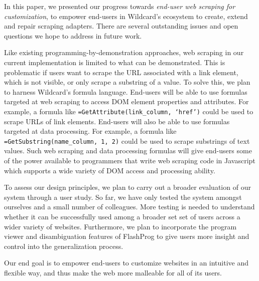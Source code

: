\documentclass[sigconf,10pt]{acmart}
\begin{document}
In this paper, we presented our progress towards \emph{end-user web
scraping for customization}, to empower end-users in Wildcard's
ecosystem to create, extend and repair scraping adapters. There are
several outstanding issues and open questions we hope to address in
future work.

Like existing programming-by-demonstration approaches, web scraping in
our current implementation is limited to what can be demonstrated. This
is problematic if users want to scrape the URL associated with a link
element, which is not visible, or only scrape a substring of a value. To
solve this, we plan to harness Wildcard's formula language. End-users
will be able to use formulas targeted at web scraping to access DOM
element properties and attributes. For example, a formula like
\texttt{=GetAttribute(link\_column,\ ‘href’)} could be used to scrape
URLs of link elements. End-users will also be able to use formulas
targeted at data processing. For example, a formula like
\texttt{=GetSubstring(name\_column,\ 1,\ 2)} could be used to scrape
substrings of text values. Such web scraping and data processing
formulas will give end-users some of the power available to programmers
that write web scraping code in Javascript which supports a wide variety
of DOM access and processing ability.

To assess our design principles, we plan to carry out a broader
evaluation of our system through a user study. So far, we have only
tested the system amongst ourselves and a small number of colleagues.
More testing is needed to understand whether it can be successfully used
among a broader set set of users across a wider variety of websites.
Furthermore, we plan to incorporate the program viewer and
disambiguation features of FlashProg \citep{mayer2015} to give users
more insight and control into the generalization process.

Our end goal is to empower end-users to customize websites in an
intuitive and flexible way, and thus make the web more malleable for all
of its users.




\end{document}
